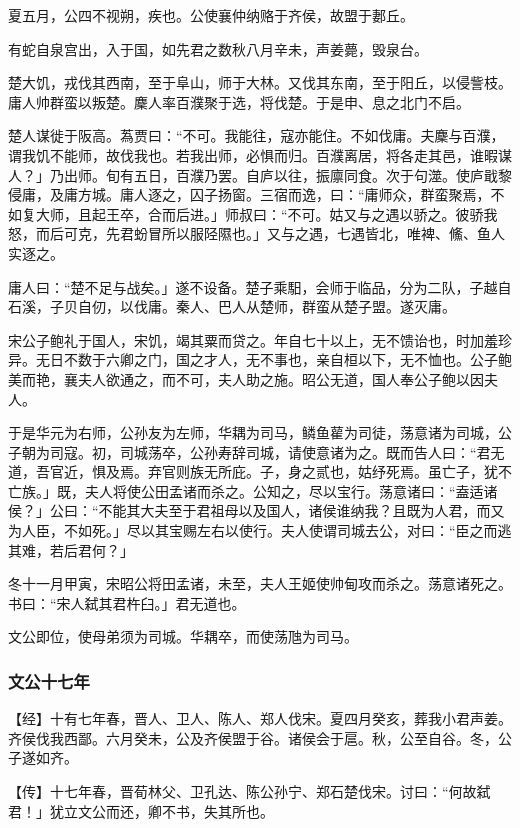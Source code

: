 \documentclass[]{article}
\begin{document}
夏五月，公四不视朔，疾也。公使襄仲纳赂于齐侯，故盟于郪丘。

有蛇自泉宫出，入于国，如先君之数秋八月辛未，声姜薨，毁泉台。

楚大饥，戎伐其西南，至于阜山，师于大林。又伐其东南，至于阳丘，以侵訾枝。庸人帅群蛮以叛楚。麇人率百濮聚于选，将伐楚。于是申、息之北门不启。

楚人谋徙于阪高。蒍贾曰：``不可。我能往，寇亦能住。不如伐庸。夫麇与百濮，谓我饥不能师，故伐我也。若我出师，必惧而归。百濮离居，将各走其邑，谁暇谋人？」乃出师。旬有五日，百濮乃罢。自庐以往，振廪同食。次于句澨。使庐戢黎侵庸，及庸方城。庸人逐之，囚子扬窗。三宿而逸，曰：``庸师众，群蛮聚焉，不如复大师，且起王卒，合而后进。」师叔曰：``不可。姑又与之遇以骄之。彼骄我怒，而后可克，先君蚡冒所以服陉隰也。」又与之遇，七遇皆北，唯裨、鯈、鱼人实逐之。

庸人曰：``楚不足与战矣。」遂不设备。楚子乘馹，会师于临品，分为二队，子越自石溪，子贝自仞，以伐庸。秦人、巴人从楚师，群蛮从楚子盟。遂灭庸。

宋公子鲍礼于国人，宋饥，竭其粟而贷之。年自七十以上，无不馈诒也，时加羞珍异。无日不数于六卿之门，国之才人，无不事也，亲自桓以下，无不恤也。公子鲍美而艳，襄夫人欲通之，而不可，夫人助之施。昭公无道，国人奉公子鲍以因夫人。

于是华元为右师，公孙友为左师，华耦为司马，鳞鱼雚为司徒，荡意诸为司城，公子朝为司寇。初，司城荡卒，公孙寿辞司城，请使意诸为之。既而告人曰：``君无道，吾官近，惧及焉。弃官则族无所庇。子，身之贰也，姑纾死焉。虽亡子，犹不亡族。」既，夫人将使公田孟诸而杀之。公知之，尽以宝行。荡意诸曰：``盍适诸侯？」公曰：``不能其大夫至于君祖母以及国人，诸侯谁纳我？且既为人君，而又为人臣，不如死。」尽以其宝赐左右以使行。夫人使谓司城去公，对曰：``臣之而逃其难，若后君何？」

冬十一月甲寅，宋昭公将田孟诸，未至，夫人王姬使帅甸攻而杀之。荡意诸死之。书曰：``宋人弑其君杵臼。」君无道也。

文公即位，使母弟须为司城。华耦卒，而使荡虺为司马。

\hypertarget{header-n1260}{%
\subsubsection{文公十七年}\label{header-n1260}}

【经】十有七年春，晋人、卫人、陈人、郑人伐宋。夏四月癸亥，葬我小君声姜。齐侯伐我西鄙。六月癸未，公及齐侯盟于谷。诸侯会于扈。秋，公至自谷。冬，公子遂如齐。

【传】十七年春，晋荀林父、卫孔达、陈公孙宁、郑石楚伐宋。讨曰：``何故弑君！」犹立文公而还，卿不书，失其所也。
\end{document}
